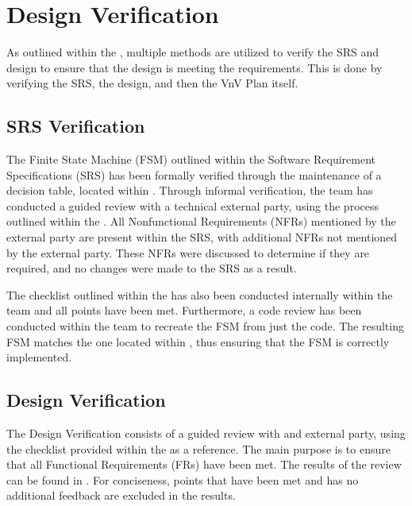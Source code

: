 \documentclass[12pt, titlepage]{article}
\begin{document}
\newpage

\tableofcontents

\listoftables %

\listoffigures %

\newpage


\section{Design Verification}
\label{sec:designVerification}
As outlined within the , multiple methods are utilized to verify the SRS and design to ensure that the design is meeting the requirements. This is done by verifying the SRS, the design, and then the VnV Plan itself.

\subsection{SRS Verification}
\label{subsec:srsVerification}
The Finite State Machine (FSM) outlined within the Software Requirement Specifications (SRS) has been formally verified through the maintenance of a decision table, located within . Through informal verification, the team has conducted a guided review with a technical external party, using the process outlined within the . All Nonfunctional Requirements (NFRs) mentioned by the external party are present within the SRS, with additional NFRs not mentioned by the external party. These NFRs were discussed to determine if they are required, and no changes were made to the SRS as a result. 

The checklist outlined within the  has also been conducted internally within the team and all points have been met. Furthermore, a code review has been conducted within the team to recreate the FSM from just the code. The resulting FSM matches the one located within , thus ensuring that the FSM is correctly implemented.

\subsection{Design Verification}
\label{subsec:designVerification}
The Design Verification consists of a guided review with and external party, using the checklist provided within the  as a reference. The main purpose is to ensure that all Functional Requirements (FRs) have been met. The results of the review can be found in . For conciseness, points that have been met and has no additional feedback are excluded in the results.
\end{document}
